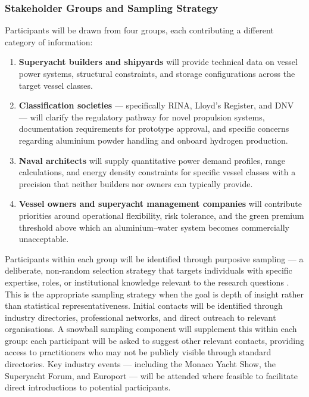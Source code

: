 \documentclass[12pt]{article}
\begin{document}
\subsubsection*{Stakeholder Groups and Sampling Strategy}

Participants will be drawn from four groups, each contributing a different 
category of information:

\begin{enumerate}
    \item \textbf{Superyacht builders and shipyards} will provide technical data 
    on vessel power systems, structural constraints, and storage configurations 
    across the target vessel classes.

    \item \textbf{Classification societies} --- specifically RINA, Lloyd's 
    Register, and DNV --- will clarify the regulatory pathway for novel propulsion 
    systems, documentation requirements for prototype approval, and specific 
    concerns regarding aluminium powder handling and onboard hydrogen production.

    \item \textbf{Naval architects} will supply quantitative power demand profiles, 
    range calculations, and energy density constraints for specific vessel classes 
    with a precision that neither builders nor owners can typically provide.

    \item \textbf{Vessel owners and superyacht management companies} will contribute 
    priorities around operational flexibility, risk tolerance, and the green premium 
    threshold above which an aluminium--water system becomes commercially 
    unacceptable.
\end{enumerate}

Participants within each group will be identified through purposive sampling --- a 
deliberate, non-random selection strategy that targets individuals with specific 
expertise, roles, or institutional knowledge relevant to the research questions 
\cite{patton2002}. This is the appropriate sampling strategy when the goal is depth 
of insight rather than statistical representativeness. Initial contacts will be 
identified through industry directories, professional networks, and direct outreach 
to relevant organisations. A snowball sampling component will supplement this within 
each group: each participant will be asked to suggest other relevant contacts, 
providing access to practitioners who may not be publicly visible through standard 
directories. Key industry events --- including the Monaco Yacht Show, the Superyacht 
Forum, and Europort --- will be attended where feasible to facilitate direct 
introductions to potential participants.
\end{document}
